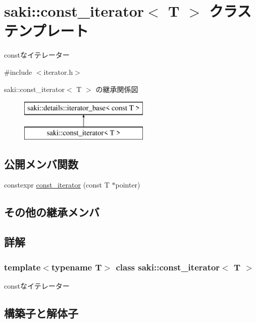 \hypertarget{classsaki_1_1const__iterator}{}\section{saki\+:\+:const\+\_\+iterator$<$ T $>$ クラステンプレート}
\label{classsaki_1_1const__iterator}


constなイテレーター  




{\ttfamily \#include $<$iterator.\+h$>$}

saki\+:\+:const\+\_\+iterator$<$ T $>$ の継承関係図\begin{figure}[H]
\begin{center}
\leavevmode
\includegraphics[height=2.000000cm]{classsaki_1_1const__iterator}
\end{center}
\end{figure}
\subsection*{公開メンバ関数}
\begin{DoxyCompactItemize}
\item 
constexpr \mbox{\hyperlink{classsaki_1_1const__iterator_a67dcc4ecf451800f4fa59a536d672ef5}{const\+\_\+iterator}} (const T $\ast$pointer)
\end{DoxyCompactItemize}
\subsection*{その他の継承メンバ}


\subsection{詳解}
\subsubsection*{template$<$typename T$>$\newline
class saki\+::const\+\_\+iterator$<$ T $>$}

constなイテレーター 

\subsection{構築子と解体子}
\mbox{\label{classsaki_1_1const__iterator_a67dcc4ecf451800f4fa59a536d672ef5}} 

